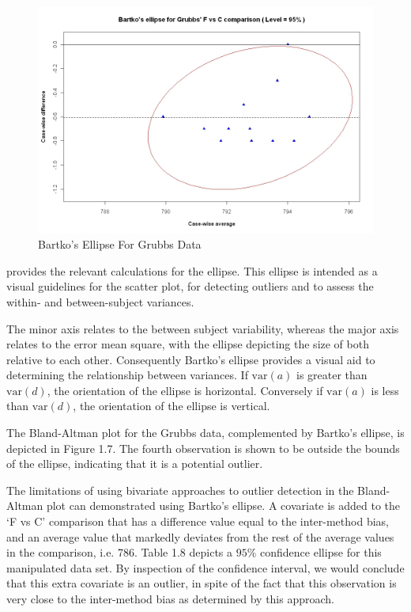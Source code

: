 \documentclass[12pt, a4paper]{report}
\theoremstyle{plain}
\theoremstyle{definition}
\theoremstyle{remark}
\begin{document}

\begin{figure}[h!]
	\includegraphics[width=130mm]{images/GrubbsBartko.jpeg}
	\caption{Bartko's Ellipse For Grubbs Data}\label{GrubbsBartko}
\end{figure}

\citet{AltmanEllipse} provides the relevant calculations for the ellipse. This ellipse is intended as a visual
guidelines for the scatter plot, for detecting outliers and to
assess the within- and between-subject variances.

The minor axis relates to the between subject variability, whereas
the major axis relates to the error mean square, with the ellipse
depicting the size of both relative to each other.
Consequently Bartko's ellipse provides a visual aid to determining the
relationship between variances. If $\mbox{var}(a)$ is greater than $\mbox{var}(d)$, the orientation of the ellipse is horizontal. Conversely if $\mbox{var}(a)$ is less than $\mbox{var}(d)$, the orientation of the ellipse is vertical.





The Bland-Altman plot for the Grubbs data, complemented by Bartko's ellipse, is depicted in Figure 1.7.
The fourth observation is shown to be outside the bounds of the ellipse, indicating that it is a potential outlier.




The limitations of using bivariate approaches to outlier detection
in the Bland-Altman plot can demonstrated using Bartko's ellipse.
A covariate is added to the `F vs C' comparison that has a
difference value equal to the inter-method bias, and an average
value that markedly deviates from the rest of the average values
in the comparison, i.e. 786. Table 1.8 depicts a $95\%$ confidence
ellipse for this manipulated data set. By inspection of the
confidence interval, we would conclude that this extra
covariate is an outlier, in spite of the fact that this
observation is very close to the inter-method bias as determined by this approach.
\end{document}
